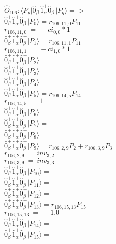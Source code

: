 \documentclass[14pt]{article}
\begin{document}
    $\hat{O}_{106}:  \langle{P_p}\vert \hat{0}_{\beta}^{+}\hat{1}_{\alpha}^{+}\hat{0}_{\beta}^{-} \vert{P_q}\rangle => $ \\ 
    $ \hat{0}_{\beta}^{+}\hat{1}_{\alpha}^{+}\hat{0}_{\beta}^{-} \vert{P_{0}}\rangle = {r}_{106,11,0}P_{11} $ \\ 
    ${r}_{106,11,0}\ =\ -{ci}_{0,0}*1 $ \\ 
    $ \hat{0}_{\beta}^{+}\hat{1}_{\alpha}^{+}\hat{0}_{\beta}^{-} \vert{P_{1}}\rangle = {r}_{106,11,1}P_{11} $ \\ 
    ${r}_{106,11,1}\ =\ -{ci}_{1,0}*1 $ \\ 
    $ \hat{0}_{\beta}^{+}\hat{1}_{\alpha}^{+}\hat{0}_{\beta}^{-} \vert{P_{2}}\rangle =  $ \\ 
    $ \hat{0}_{\beta}^{+}\hat{1}_{\alpha}^{+}\hat{0}_{\beta}^{-} \vert{P_{3}}\rangle =  $ \\ 
    $ \hat{0}_{\beta}^{+}\hat{1}_{\alpha}^{+}\hat{0}_{\beta}^{-} \vert{P_{4}}\rangle =  $ \\ 
    $ \hat{0}_{\beta}^{+}\hat{1}_{\alpha}^{+}\hat{0}_{\beta}^{-} \vert{P_{5}}\rangle = {r}_{106,14,5}P_{14} $ \\ 
    ${r}_{106,14,5}\ =\ 1 $ \\ 
    $ \hat{0}_{\beta}^{+}\hat{1}_{\alpha}^{+}\hat{0}_{\beta}^{-} \vert{P_{6}}\rangle =  $ \\ 
    $ \hat{0}_{\beta}^{+}\hat{1}_{\alpha}^{+}\hat{0}_{\beta}^{-} \vert{P_{7}}\rangle =  $ \\ 
    $ \hat{0}_{\beta}^{+}\hat{1}_{\alpha}^{+}\hat{0}_{\beta}^{-} \vert{P_{8}}\rangle =  $ \\ 
    $ \hat{0}_{\beta}^{+}\hat{1}_{\alpha}^{+}\hat{0}_{\beta}^{-} \vert{P_{9}}\rangle = {r}_{106,2,9}P_{2}+{r}_{106,3,9}P_{3} $ \\ 
    ${r}_{106,2,9}\ =\ {inv}_{3,2} $ \\ 
    ${r}_{106,3,9}\ =\ {inv}_{3,3} $ \\ 
    $ \hat{0}_{\beta}^{+}\hat{1}_{\alpha}^{+}\hat{0}_{\beta}^{-} \vert{P_{10}}\rangle =  $ \\ 
    $ \hat{0}_{\beta}^{+}\hat{1}_{\alpha}^{+}\hat{0}_{\beta}^{-} \vert{P_{11}}\rangle =  $ \\ 
    $ \hat{0}_{\beta}^{+}\hat{1}_{\alpha}^{+}\hat{0}_{\beta}^{-} \vert{P_{12}}\rangle =  $ \\ 
    $ \hat{0}_{\beta}^{+}\hat{1}_{\alpha}^{+}\hat{0}_{\beta}^{-} \vert{P_{13}}\rangle = {r}_{106,15,13}P_{15} $ \\ 
    ${r}_{106,15,13}\ =\ -1.0 $ \\ 
    $ \hat{0}_{\beta}^{+}\hat{1}_{\alpha}^{+}\hat{0}_{\beta}^{-} \vert{P_{14}}\rangle =  $ \\ 
    $ \hat{0}_{\beta}^{+}\hat{1}_{\alpha}^{+}\hat{0}_{\beta}^{-} \vert{P_{15}}\rangle =  $ \\ 
    
\end{document}
